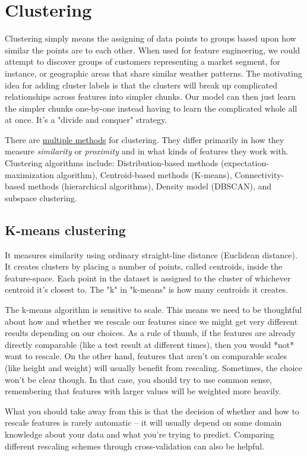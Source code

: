 \documentclass[12pt]{report}
\begin{document}
\section{Clustering}
Clustering simply means the assigning of data points to groups based upon how similar the points are to each other. When used for feature engineering, we could attempt to discover groups of customers representing a market segment, for instance, or geographic areas that share similar weather patterns. The motivating idea for adding cluster labels is that the clusters will break up complicated relationships across features into simpler chunks. Our model can then just learn the simpler chunks one-by-one instead having to learn the complicated whole all at once. It's a "divide and conquer" strategy.

There are \href{https://www.geeksforgeeks.org/different-types-clustering-algorithm/#}{multiple methods} for clustering. They differ primarily in how they measure \textit{similarity} or \textit{proximity} and in what kinds of features they work with. Clustering algorithms include: Distribution-based methods (expectation-maximization algorithm), Centroid-based methods (K-means), Connectivity-based methods (hierarchical algorithms), Density model (DBSCAN), and subspace clustering.

\subsection{K-means clustering}
It measures similarity using ordinary straight-line distance (Euclidean distance). It creates clusters by placing a number of points, called centroids, inside the feature-space. Each point in the dataset is assigned to the cluster of whichever centroid it's closest to. The "k" in "k-means" is how many centroids it creates.

The k-means algorithm is sensitive to scale. This means we need to be thoughtful about how and whether we rescale our features since we might get very different results depending on our choices. As a rule of thumb, if the features are already directly comparable (like a test result at different times), then you would *not* want to rescale. On the other hand, features that aren't on comparable scales (like height and weight) will usually benefit from rescaling. Sometimes, the choice won't be clear though. In that case, you should try to use common sense, remembering that features with larger values will be weighted more heavily.

What you should take away from this is that the decision of whether and how to rescale features is rarely automatic -- it will usually depend on some domain knowledge about your data and what you're trying to predict. Comparing different rescaling schemes through cross-validation can also be helpful.
\end{document}
